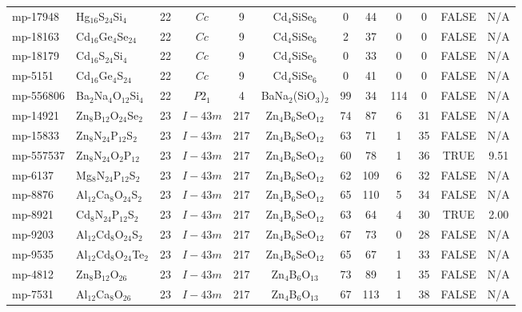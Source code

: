{\begin{longtable}{llcccccccccc}
    mp-17948 & Hg$_{16}$S$_{24}$Si$_{4}$ & 22    & $Cc$  & 9     & Cd$_{4}$SiSe$_{6}$ & 0     & 44    & 0     & 0     & FALSE & N/A \\
    mp-18163 & Cd$_{16}$Ge$_{4}$Se$_{24}$ & 22    & $Cc$  & 9     & Cd$_{4}$SiSe$_{6}$ & 2     & 37    & 0     & 0     & FALSE & N/A \\
    mp-18179 & Cd$_{16}$S$_{24}$Si$_{4}$ & 22    & $Cc$  & 9     & Cd$_{4}$SiSe$_{6}$ & 0     & 33    & 0     & 0     & FALSE & N/A \\
    mp-5151 & Cd$_{16}$Ge$_{4}$S$_{24}$ & 22    & $Cc$  & 9     & Cd$_{4}$SiSe$_{6}$ & 0     & 41    & 0     & 0     & FALSE & N/A \\
    mp-556806 & Ba$_{2}$Na$_{4}$O$_{12}$Si$_{4}$ & 22    & $P2_1$ & 4     & BaNa$_{2}$(SiO$_{3}$)$_{2}$ & 99    & 34    & 114   & 0     & FALSE & N/A \\
    mp-14921 & Zn$_{8}$B$_{12}$O$_{24}$Se$_{2}$ & 23    & $I-43m$ & 217   & Zn$_{4}$B$_{6}$SeO$_{12}$ & 74    & 87    & 6     & 31    & FALSE & N/A \\
    mp-15833 & Zn$_{8}$N$_{24}$P$_{12}$S$_{2}$ & 23    & $I-43m$ & 217   & Zn$_{4}$B$_{6}$SeO$_{12}$ & 63    & 71    & 1     & 35    & FALSE & N/A \\
    mp-557537 & Zn$_{8}$N$_{24}$O$_{2}$P$_{12}$ & 23    & $I-43m$ & 217   & Zn$_{4}$B$_{6}$SeO$_{12}$ & 60    & 78    & 1     & 36    & TRUE  & 9.51  \\
    mp-6137 & Mg$_{8}$N$_{24}$P$_{12}$S$_{2}$ & 23    & $I-43m$ & 217   & Zn$_{4}$B$_{6}$SeO$_{12}$ & 62    & 109   & 6     & 32    & FALSE & N/A \\
    mp-8876 & Al$_{12}$Ca$_{8}$O$_{24}$S$_{2}$ & 23    & $I-43m$ & 217   & Zn$_{4}$B$_{6}$SeO$_{12}$ & 65    & 110   & 5     & 34    & FALSE & N/A \\
    mp-8921 & Cd$_{8}$N$_{24}$P$_{12}$S$_{2}$ & 23    & $I-43m$ & 217   & Zn$_{4}$B$_{6}$SeO$_{12}$ & 63    & 64    & 4     & 30    & TRUE  & 2.00  \\
    mp-9203 & Al$_{12}$Cd$_{8}$O$_{24}$S$_{2}$ & 23    & $I-43m$ & 217   & Zn$_{4}$B$_{6}$SeO$_{12}$ & 67    & 73    & 0     & 28    & FALSE & N/A \\
    mp-9535 & Al$_{12}$Cd$_{8}$O$_{24}$Te$_{2}$ & 23    & $I-43m$ & 217   & Zn$_{4}$B$_{6}$SeO$_{12}$ & 65    & 67    & 1     & 33    & FALSE & N/A \\
    mp-4812 & Zn$_{8}$B$_{12}$O$_{26}$ & 23    & $I-43m$ & 217   & Zn$_{4}$B$_{6}$O$_{13}$ & 73    & 89    & 1     & 35    & FALSE & N/A \\
    mp-7531 & Al$_{12}$Ca$_{8}$O$_{26}$ & 23    & $I-43m$ & 217   & Zn$_{4}$B$_{6}$O$_{13}$ & 67    & 113   & 1     & 38    & FALSE & N/A \\

\end{longtable}}
